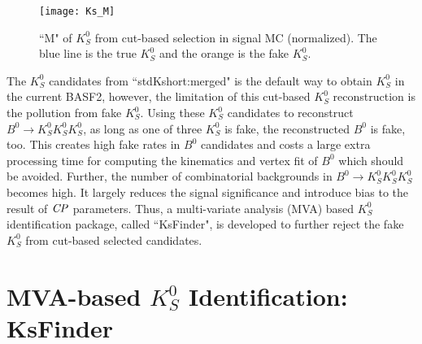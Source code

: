 \begin{figure}[htpb]
	\centering 
	\texttt{[image: Ks\_M]}
	\caption{``M" of $K_S^0$ from cut-based selection in signal MC (normalized). The blue line is the true $K_S^0$ and the orange is the fake $K_S^0$. }
	\label{fig:ksM_sigmc}
\end{figure}

The $K_S^0$ candidates from ``stdKshort:merged" is the default way to obtain $K_S^0$ in the current BASF2, 
however, the limitation of this cut-based $K_S^0$ reconstruction is the pollution from fake $K_S^0$. Using these $K_S^0$ candidates to reconstruct $B^0 \to K_S^0  K_S^0  K_S^0$, as long as one of three $K_S^0$ is fake, the reconstructed $B^0$ is fake, too. 
 This creates high fake rates in $B^0$ candidates and costs a large extra processing time for computing the kinematics and vertex fit of $B^0$ which should be avoided. Further, the number of combinatorial backgrounds in $B^0 \to K_S^0  K_S^0  K_S^0$ becomes high. It largely reduces the signal significance and introduce bias to the result of $\it{CP}$ parameters. Thus, a multi-variate analysis (MVA) based $K_S^0$ identification package, called ``KsFinder", is developed to further reject the fake $K_S^0$ from cut-based selected candidates.


\section{MVA-based $K_S^0$ Identification: KsFinder}

